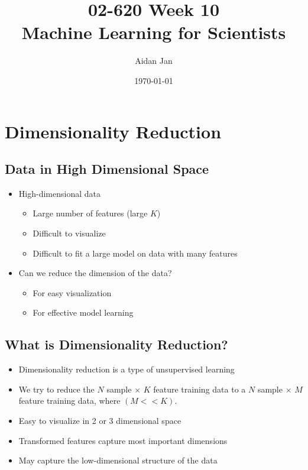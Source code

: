 \documentclass[10pt]{article}
\title{02-620 Week 10 \\ \large{Machine Learning for Scientists}}
\author{Aidan Jan}
\date{\today}
\begin{document}
\maketitle

\section*{Dimensionality Reduction}
\subsection*{Data in High Dimensional Space}
\begin{itemize}
	\item High-dimensional data
	\begin{itemize}
	    \item Large number of features (large $K$)
	    \item Difficult to visualize
	    \item Difficult to fit a large model on data with many features
    \end{itemize}
    \item Can we reduce the dimension of the data?
    \begin{itemize}
	    \item For easy visualization
	    \item For effective model learning
    \end{itemize}
\end{itemize}

\subsection*{What is Dimensionality Reduction?}
\begin{itemize}
	\item Dimensionality reduction is a type of unsupervised learning
	\item We try to reduce the $N$ sample $\times$ $K$ feature training data to a $N$ sample $\times$ $M$ feature training data, where $(M << K)$.
	\item Easy to visualize in 2 or 3 dimensional space
	\item Transformed features capture most important dimensions
	\item May capture the low-dimensional structure of the data
\end{itemize}
\end{document}
